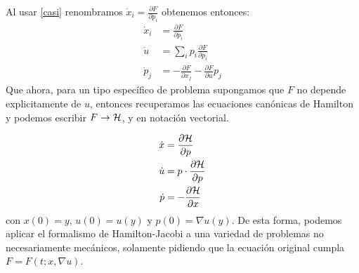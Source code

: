 Al usar \eqref{casi} renombramos $\dot x_i=\frac{\partial F}{\partial p_i}$ obtenemos entonces:
\begin{equation*}
	\begin{split}
			\dot x_i&=\frac{\partial F}{\partial p_i}\\
			\dot{u}&=\sum_i p_i\frac{\partial F}{\partial p_i}\\
			\dot p_j&=-\frac{\partial F}{\partial x_j}-\frac{\partial F}{\partial u}p_j
	\end{split}
\end{equation*}
Que ahora, para un tipo espec\'ifico de problema supongamos que $F$ no depende explicitamente de $u$, entonces recuperamos las ecuaciones can\'onicas de Hamilton y podemos escribir $F\to\mathcal{H}$, y en notaci\'on vectorial.

\begin{equation*}
	\begin{split}
			\dot x&=\frac{\partial \mathcal{H}}{\partial p}\\
			\dot{u}&=p\cdot \frac{\partial \mathcal{H}}{\partial p}\\
			\dot p&=-\frac{\partial \mathcal{H}}{\partial x}
	\end{split}
\end{equation*}
con $x(0)=y$, $u(0)=u(y)$ y $p(0)=\nabla u(y)$.
De esta forma, podemos aplicar el formalismo de Hamilton-Jacobi a una variedad de problemas no necesariamente mec\'anicos, solamente pidiendo que la ecuaci\'on original cumpla $F=F(t;x,\nabla u)$. 


    